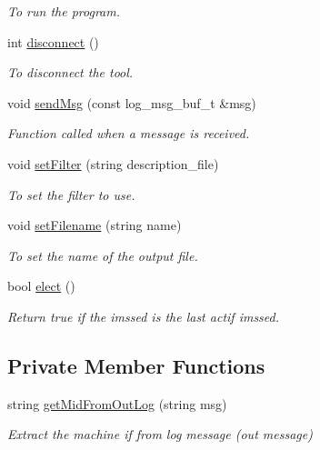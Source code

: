 \begin{DoxyCompactItemize}
\begin{DoxyCompactList}\small\item\em To run the program. \item\end{DoxyCompactList}\item 
int \hyperlink{classIMSVishnuTool_a34b473a40f14f34e5fe75ff9c1dfd4b3}{disconnect} ()
\begin{DoxyCompactList}\small\item\em To disconnect the tool. \item\end{DoxyCompactList}\item 
void \hyperlink{classIMSVishnuTool_a091fff6fed4eed02270497f66131a094}{sendMsg} (const log\_\-msg\_\-buf\_\-t \&msg)
\begin{DoxyCompactList}\small\item\em Function called when a message is received. \item\end{DoxyCompactList}\item 
void \hyperlink{classIMSVishnuTool_a0fdec4505183f4fc8308f1f3e2afce5f}{setFilter} (string description\_\-file)
\begin{DoxyCompactList}\small\item\em To set the filter to use. \item\end{DoxyCompactList}\item 
void \hyperlink{classIMSVishnuTool_ab44fc6ad246e4c82a513c4f08bf74960}{setFilename} (string name)
\begin{DoxyCompactList}\small\item\em To set the name of the output file. \item\end{DoxyCompactList}\item 
bool \hyperlink{classIMSVishnuTool_aeb84a7b24348bdd9c7208989966404ed}{elect} ()
\begin{DoxyCompactList}\small\item\em Return true if the imssed is the last actif imssed. \item\end{DoxyCompactList}\end{DoxyCompactItemize}
\subsection*{Private Member Functions}
\begin{DoxyCompactItemize}
\item 
string \hyperlink{classIMSVishnuTool_aa703880867b1ac81c53dc59e8599d6fa}{getMidFromOutLog} (string msg)
\begin{DoxyCompactList}\small\item\em Extract the machine if from log message (out message) \item\end{DoxyCompactList}\end{DoxyCompactItemize}
